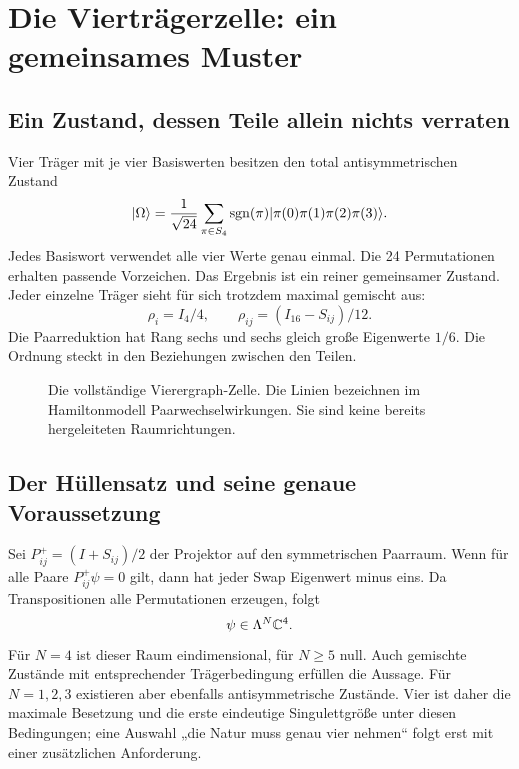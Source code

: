 \chapter{Die Vierträgerzelle: ein gemeinsames Muster}
\label{ch:zelle}
\section{Ein Zustand, dessen Teile allein nichts verraten}
Vier Träger mit je vier Basiswerten besitzen den total antisymmetrischen Zustand
\begin{equation}
\lvert\Omega\rangle=\frac1{\sqrt{24}}\sum_{\pi\in S_4}\operatorname{sgn}(\pi)
\lvert\pi(0)\pi(1)\pi(2)\pi(3)\rangle.
\label{eq:omega}
\end{equation}
Jedes Basiswort verwendet alle vier Werte genau einmal. Die 24 Permutationen erhalten passende Vorzeichen. Das Ergebnis ist ein reiner gemeinsamer Zustand. Jeder einzelne Träger sieht für sich trotzdem maximal gemischt aus:
\begin{equation}
\rho_i=I_4/4,\qquad \rho_{ij}=(I_{16}-S_{ij})/12.
\end{equation}
Die Paarreduktion hat Rang sechs und sechs gleich große Eigenwerte $1/6$. Die Ordnung steckt in den Beziehungen zwischen den Teilen. 

\begin{figure}[H]\centering
{}
\caption{Die vollständige Vierergraph-Zelle. Die Linien bezeichnen im Hamiltonmodell Paarwechselwirkungen. Sie sind keine bereits hergeleiteten Raumrichtungen.}
\end{figure}

\section{Der Hüllensatz und seine genaue Voraussetzung}
Sei $P^+_{ij}=(I+S_{ij})/2$ der Projektor auf den symmetrischen Paarraum. Wenn für alle Paare $P^+_{ij}\psi=0$ gilt, dann hat jeder Swap Eigenwert minus eins. Da Transpositionen alle Permutationen erzeugen, folgt
\begin{equation}
\psi\in\Lambda^N\mathbb C^4.
\end{equation}
Für $N=4$ ist dieser Raum eindimensional, für $N\ge5$ null. Auch gemischte Zustände mit entsprechender Trägerbedingung erfüllen die Aussage. Für $N=1,2,3$ existieren aber ebenfalls antisymmetrische Zustände. Vier ist daher die maximale Besetzung und die erste eindeutige Singulettgröße unter diesen Bedingungen; eine Auswahl „die Natur muss genau vier nehmen“ folgt erst mit einer zusätzlichen Anforderung.

